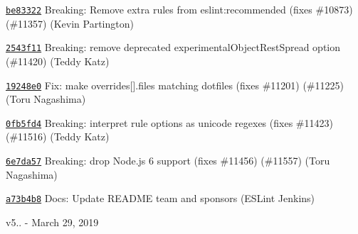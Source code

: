 \begin{DoxyItemize}
\item \href{https://github.com/eslint/eslint/commit/be833229b355eafb90f3e0bbc29bb106e100bed0}{\texttt{ {\ttfamily be83322}}} Breaking\+: Remove extra rules from eslint\+:recommended (fixes \#10873) (\#11357) (Kevin Partington)
\item \href{https://github.com/eslint/eslint/commit/2543f11dfe8069ed5096073169cf6791d42454db}{\texttt{ {\ttfamily 2543f11}}} Breaking\+: remove deprecated experimental\+Object\+Rest\+Spread option (\#11420) (Teddy Katz)
\item \href{https://github.com/eslint/eslint/commit/19248e0838425748d75518fe9f0a985587793378}{\texttt{ {\ttfamily 19248e0}}} Fix\+: make {\ttfamily overrides\mbox{[}\mbox{]}.files} matching dotfiles (fixes \#11201) (\#11225) (Toru Nagashima)
\item \href{https://github.com/eslint/eslint/commit/0fb5fd402334098dc44cbfbb8ab25919da04843d}{\texttt{ {\ttfamily 0fb5fd4}}} Breaking\+: interpret rule options as unicode regexes (fixes \#11423) (\#11516) (Teddy Katz)
\item \href{https://github.com/eslint/eslint/commit/6e7da57dddc41830df4aee77e31c4320c1557350}{\texttt{ {\ttfamily 6e7da57}}} Breaking\+: drop Node.\+js 6 support (fixes \#11456) (\#11557) (Toru Nagashima)
\item \href{https://github.com/eslint/eslint/commit/a73b4b8d6398b00bdaf90599d9e6d1c80f000f88}{\texttt{ {\ttfamily a73b4b8}}} Docs\+: Update README team and sponsors (ESLint Jenkins)
\end{DoxyItemize}

v5.. -\/ March 29, 2019


